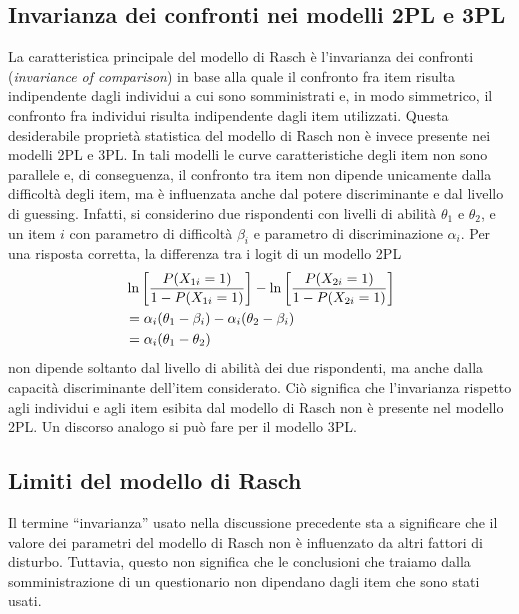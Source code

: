 \subsection{Invarianza dei confronti nei modelli 2PL e 3PL}

La caratteristica principale del modello di Rasch è l'invarianza dei confronti (\emph{invariance  of  comparison}) in base alla quale il confronto fra item risulta indipendente dagli individui a cui sono somministrati e, in modo simmetrico, il confronto fra individui risulta indipendente dagli item utilizzati. Questa desiderabile proprietà statistica del modello di Rasch non è invece presente nei modelli 2PL e 3PL. In tali modelli le curve caratteristiche degli item non sono parallele e, di conseguenza, il confronto tra item non dipende unicamente dalla difficoltà degli item, ma è influenzata anche dal potere discriminante e dal livello di guessing.  Infatti, si considerino due rispondenti con livelli di abilità $\theta_1$ e $\theta_2$, e un item $i$ con parametro di difficoltà $\beta_i$ e parametro di discriminazione $\alpha_i$. Per una risposta corretta, la differenza tra i logit di un modello 2PL 
\begin{align}
&\ln \left[\frac{P(X_{1i}=1)}{1-P(X_{1i}=1)}\right] - \ln \left[ \frac{P(X_{2i}=1)}{1-P(X_{2i}=1)} \right]\notag\\
&=\alpha_i(\theta_1 -\beta_i) -\alpha_i(\theta_2 -\beta_i)\notag\\
&= \alpha_i(\theta_1-\theta_2) \notag
\end{align}  
non dipende soltanto dal livello di abilità dei due rispondenti, ma anche dalla capacità discriminante dell'item considerato.  Ciò significa che l'invarianza rispetto agli individui e agli item esibita dal modello di Rasch non è presente nel modello 2PL. Un discorso analogo si può fare per il modello 3PL. 

\subsection{Limiti del modello di Rasch}

Il termine ``invarianza'' usato nella discussione precedente sta a significare che il valore dei parametri del modello di Rasch non è influenzato da altri fattori di disturbo. Tuttavia, questo non significa che le conclusioni che traiamo dalla somministrazione di un questionario non dipendano dagli item che sono stati usati.  

